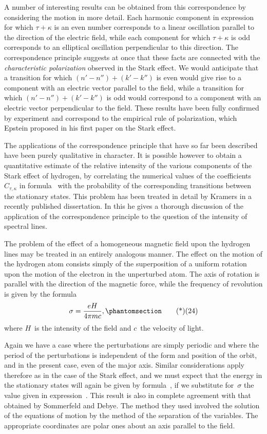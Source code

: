 A number of interesting results can be obtained from this
correspondence by considering the motion in more detail. Each
harmonic component in expression~ for which $\tau + \kappa$ is an even
number corresponds to a linear oscillation parallel to the direction
of the electric field, while each component for which $\tau + \kappa$ is odd
corresponds to an elliptical oscillation perpendicular to this direction.
The correspondence principle suggests at once that these
facts are connected with the \emph{characteristic polarization} observed in
the Stark effect. We would anticipate that a transition for which
$(n' - n'') + (k' - k'')$ is even would give rise to a component with an
electric vector parallel to the field, while a transition for which
$(n' - n'') + (k' - k'')$ is odd would correspond to a component with an
electric vector perpendicular to the field. These results have been
fully confirmed by experiment and correspond to the empirical rule
of polarization, which Epstein proposed in his first paper on the
Stark effect.

The applications of the correspondence principle that have so
far been described have been purely qualitative in character. It is
possible however to obtain a quantitative estimate of the relative
intensity of the various components of the Stark effect of hydrogen,
by correlating the numerical values of the coefficients~$C_{\tau,\kappa}$ in formula~
with the probability of the corresponding transitions between
the stationary states. This problem has been treated in detail by
Kramers in a recently published dissertation. In this he gives a
thorough discussion of the application of the correspondence principle
to the question of the intensity of spectral lines.

 The problem of the effect of a homogeneous
magnetic field upon the hydrogen lines may be treated in an
entirely analogous manner. The effect on the motion of the hydrogen
atom consists simply of the superposition of a uniform rotation
upon the motion of the electron in the unperturbed atom.
The axis of rotation is parallel with the direction of the magnetic
force, while the frequency of revolution is given by the formula
\[
\sigma = \frac{eH}{4\pi mc},
\Tag{(24)}
\]
where $H$~is the intensity of the field and $c$~the velocity of light.

Again we have a case where the perturbations are simply
periodic and where the period of the perturbations is independent
of the form and position of the orbit, and in the present case, even
of the major axis. Similar considerations apply therefore as in the
case of the Stark effect, and we must expect that the energy in the
stationary states will again be given by formula~, if we substitute
for~$\sigma$ the value given in expression~. This result is
also in complete agreement with that obtained by Sommerfeld and
Debye. The method they used involved the solution of the equations
of motion by the method of the separation of the variables. The
appropriate coordinates are polar ones about an axis parallel to
the field.

